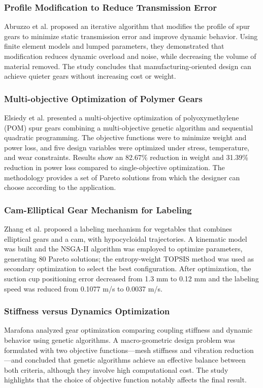\documentclass{article}
\begin{document}
\subsubsection*{Profile Modification to Reduce Transmission Error}
Abruzzo et al. \cite{abruzzo2023profile} proposed an iterative algorithm that modifies the profile of spur gears to minimize static transmission error and improve dynamic behavior.
Using finite element models and lumped parameters, they demonstrated that modification reduces dynamic overload and noise, while decreasing the volume of material removed.
The study concludes that manufacturing-oriented design can achieve quieter gears without increasing cost or weight.

\subsubsection*{Multi-objective Optimization of Polymer Gears}
Elsiedy et al. \cite{elsiedy2024multi} presented a multi-objective optimization of polyoxymethylene (POM) spur gears combining a multi-objective genetic algorithm and sequential quadratic programming.
The objective functions were to minimize weight and power loss, and five design variables were optimized under stress, temperature, and wear constraints.
Results show an 82.67\% reduction in weight and 31.39\% reduction in power loss compared to single-objective optimization.
The methodology provides a set of Pareto solutions from which the designer can choose according to the application.

\subsubsection*{Cam-Elliptical Gear Mechanism for Labeling}
Zhang et al. \cite{zhang2024cam} proposed a labeling mechanism for vegetables that combines elliptical gears and a cam, with hypocycloidal trajectories.
A kinematic model was built and the NSGA-II algorithm was employed to optimize parameters, generating 80 Pareto solutions; the entropy-weight TOPSIS method was used as secondary optimization to select the best configuration.
After optimization, the suction cup positioning error decreased from 1.3 mm to 0.12 mm and the labeling speed was reduced from 0.1077 m/s to 0.0037 m/s.

\subsubsection*{Stiffness versus Dynamics Optimization}
Marafona \cite{marafona2024stiffness} analyzed gear optimization comparing coupling stiffness and dynamic behavior using genetic algorithms.
A macro-geometric design problem was formulated with two objective functions—mesh stiffness and vibration reduction—and concluded that genetic algorithms achieve an effective balance between both criteria, although they involve high computational cost.
The study highlights that the choice of objective function notably affects the final result.
\end{document}
